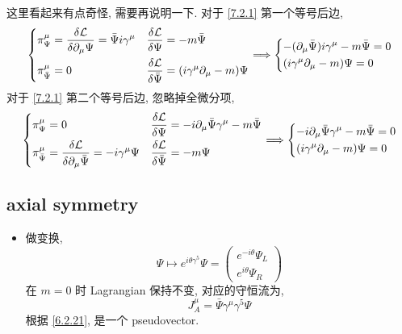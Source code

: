 \begin{itemize}
\begin{tcolorbox}[title=calculation:]
		这里看起来有点奇怪, 需要再说明一下. 对于 \eqref{7.2.1} 第一个等号后边,
		\begin{equation}
			\begin{dcases}
				\pi_\Psi^\mu = \frac{\delta \mathcal{L}}{\delta \partial_\mu \Psi} = \bar{\Psi} i \gamma^\mu & \frac{\delta \mathcal{L}}{\delta \Psi} = - m \bar{\Psi} \\
				\pi_{\bar{\Psi}}^\mu = 0 & \frac{\delta \mathcal{L}}{\delta \bar{\Psi}} = (i \gamma^\mu \partial_\mu - m) \Psi
			\end{dcases} \Longrightarrow \begin{dcases}
				- (\partial_\mu \bar{\Psi}) i \gamma^\mu - m \bar{\Psi} = 0 \\
				(i \gamma^\mu \partial_\mu - m) \Psi = 0
			\end{dcases}
		\end{equation}
		对于 \eqref{7.2.1} 第二个等号后边, 忽略掉全微分项,
		\begin{equation}
			\begin{dcases}
				\pi_\Psi^\mu = 0 & \frac{\delta \mathcal{L}}{\delta \Psi} = - i \partial_\mu \bar{\Psi} \gamma^\mu - m \bar{\Psi} \\
				\pi_{\bar{\Psi}}^\mu = \frac{\delta \mathcal{L}}{\delta \partial_\mu \bar{\Psi}} = - i \gamma^\mu \Psi & \frac{\delta \mathcal{L}}{\delta \bar{\Psi}} = - m \Psi
			\end{dcases} \Longrightarrow \begin{dcases}
				- i \partial_\mu \bar{\Psi} \gamma^\mu - m \bar{\Psi} = 0 \\
				(i \gamma^\mu \partial_\mu - m) \Psi = 0
			\end{dcases}
		\end{equation}
	\end{tcolorbox}
\end{itemize}

\subsection{axial symmetry}
\begin{itemize}
	\item 做变换,
	\begin{equation}
		\Psi \mapsto e^{i \theta \gamma^5} \Psi = \begin{pmatrix}
			e^{- i \theta} \Psi_L \\
			e^{i \theta} \Psi_R
		\end{pmatrix}
	\end{equation}
	在 $m = 0$ 时 Lagrangian 保持不变, 对应的守恒流为,
	\begin{equation}
		J_A^\mu = \bar{\Psi} \gamma^\mu \gamma^5 \Psi
	\end{equation}
	根据 \eqref{6.2.21}, 是一个 pseudovector.
\end{itemize}

